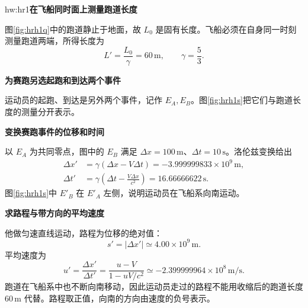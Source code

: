 \begin{drillsolution}{hw:hr1}\textbf{在飞船同时面上测量跑道长度}\par\nobreak
图\ref{fig:hrh1q}中的跑道静止于地面，故 $L_0$ 是固有长度。飞船必须在自身同一时刻测量跑道两端，所得长度为
\[
L'=\frac{L_0}{\gamma}=60\,\mathrm m,\qquad \gamma=\frac53.
\]


\par\medskip{}\noindent\textbf{为赛跑另选起跑和到达两个事件}\par\nobreak
运动员的起跑、到达是另外两个事件，记作 $E_A,E_B$。图\ref{fig:hrh1s}把它们与跑道长度的测量分开表示。



\par\medskip{}\noindent\textbf{变换赛跑事件的位移和时间}\par\nobreak
以 $E_A$ 为共同零点，图中的 $E_B$ 满足 $\Delta x=100\,\mathrm m$、$\Delta t=10\,\mathrm s$。洛伦兹变换给出
\begin{align*}
\Delta x'&=\gamma(\Delta x-V\Delta t)
 =-3.999999833\times10^9\,\mathrm m,\\
\Delta t'&=\gamma\left(\Delta t-\frac{V\Delta x}{c^2}\right)
 =16.66666622\,\mathrm s.
\end{align*}
图\ref{fig:hrh1s}中 $E'_B$ 在 $E'_A$ 左侧，说明运动员在飞船系向南运动。



\par\medskip{}\noindent\textbf{求路程与带方向的平均速度}\par\nobreak
他做匀速直线运动，路程为位移的绝对值：
\[
\boxed{s'=|\Delta x'|\simeq4.00\times10^9\,\mathrm m}.
\]
平均速度为
\[
\boxed{u'=\frac{\Delta x'}{\Delta t'}
 =\frac{u-V}{1-uV/c^2}
 \simeq-2.399999964\times10^8\,\mathrm{m/s}}.
\]
跑道在飞船系中也不断向南移动，因此运动员走过的路程不能用收缩后的跑道长度 $60\,\mathrm m$ 代替。路程取正值，向南的方向由速度的负号表示。



\end{drillsolution}
